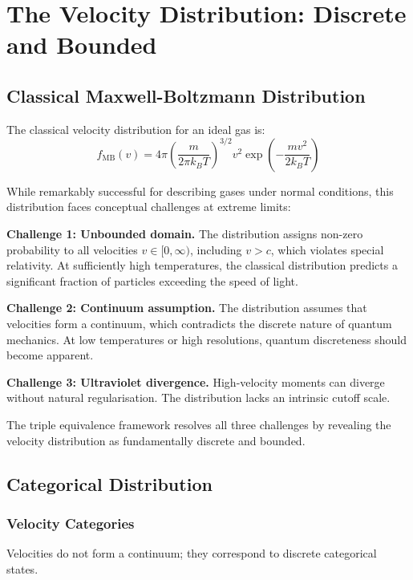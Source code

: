\section{The Velocity Distribution: Discrete and Bounded}
\label{sec:velocity_distribution}

\subsection{Classical Maxwell-Boltzmann Distribution}

The classical velocity distribution for an ideal gas is:
\begin{equation}
f_{\text{MB}}(v) = 4\pi \left(\frac{m}{2\pi k_B T}\right)^{3/2} v^2 \exp\left(-\frac{mv^2}{2k_B T}\right)
\end{equation}

While remarkably successful for describing gases under normal conditions, this distribution faces conceptual challenges at extreme limits:

\textbf{Challenge 1: Unbounded domain.} The distribution assigns non-zero probability to all velocities $v \in [0, \infty)$, including $v > c$, which violates special relativity. At sufficiently high temperatures, the classical distribution predicts a significant fraction of particles exceeding the speed of light.

\textbf{Challenge 2: Continuum assumption.} The distribution assumes that velocities form a continuum, which contradicts the discrete nature of quantum mechanics. At low temperatures or high resolutions, quantum discreteness should become apparent.

\textbf{Challenge 3: Ultraviolet divergence.} High-velocity moments can diverge without natural regularisation. The distribution lacks an intrinsic cutoff scale.

The triple equivalence framework resolves all three challenges by revealing the velocity distribution as fundamentally discrete and bounded.

\subsection{Categorical Distribution}

\subsubsection{Velocity Categories}

Velocities do not form a continuum; they correspond to discrete categorical states.


